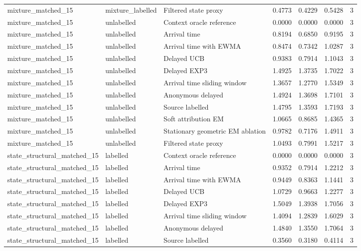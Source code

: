 \begin{tabular}{llllllr}
mixture\_matched\_15 & mixture\_labelled & Filtered state proxy & 0.4773 & 0.4229 & 0.5428 & 3 \\
mixture\_matched\_15 & unlabelled & Context oracle reference & 0.0000 & 0.0000 & 0.0000 & 3 \\
mixture\_matched\_15 & unlabelled & Arrival time & 0.8194 & 0.6850 & 0.9195 & 3 \\
mixture\_matched\_15 & unlabelled & Arrival time with EWMA & 0.8474 & 0.7342 & 1.0287 & 3 \\
mixture\_matched\_15 & unlabelled & Delayed UCB & 0.9383 & 0.7914 & 1.1043 & 3 \\
mixture\_matched\_15 & unlabelled & Delayed EXP3 & 1.4925 & 1.3735 & 1.7022 & 3 \\
mixture\_matched\_15 & unlabelled & Arrival time sliding window & 1.3657 & 1.2770 & 1.5349 & 3 \\
mixture\_matched\_15 & unlabelled & Anonymous delayed & 1.4924 & 1.3698 & 1.7101 & 3 \\
mixture\_matched\_15 & unlabelled & Source labelled & 1.4795 & 1.3593 & 1.7193 & 3 \\
mixture\_matched\_15 & unlabelled & Soft attribution EM & 1.0665 & 0.8685 & 1.4365 & 3 \\
mixture\_matched\_15 & unlabelled & Stationary geometric EM ablation & 0.9782 & 0.7176 & 1.4911 & 3 \\
mixture\_matched\_15 & unlabelled & Filtered state proxy & 1.0493 & 0.7991 & 1.5217 & 3 \\
state\_structural\_matched\_15 & labelled & Context oracle reference & 0.0000 & 0.0000 & 0.0000 & 3 \\
state\_structural\_matched\_15 & labelled & Arrival time & 0.9352 & 0.7914 & 1.2212 & 3 \\
state\_structural\_matched\_15 & labelled & Arrival time with EWMA & 0.9449 & 0.8363 & 1.1441 & 3 \\
state\_structural\_matched\_15 & labelled & Delayed UCB & 1.0729 & 0.9663 & 1.2277 & 3 \\
state\_structural\_matched\_15 & labelled & Delayed EXP3 & 1.5049 & 1.3938 & 1.7056 & 3 \\
state\_structural\_matched\_15 & labelled & Arrival time sliding window & 1.4094 & 1.2839 & 1.6029 & 3 \\
state\_structural\_matched\_15 & labelled & Anonymous delayed & 1.4840 & 1.3550 & 1.7064 & 3 \\
state\_structural\_matched\_15 & labelled & Source labelled & 0.3560 & 0.3180 & 0.4114 & 3 \\

\end{tabular}
